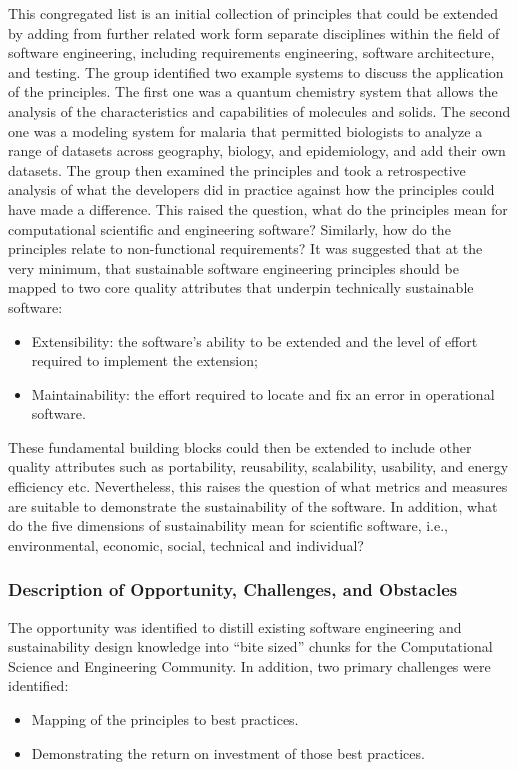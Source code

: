 This congregated list is an initial collection of principles that could be
extended by adding from further related work form separate disciplines within
the field of software engineering, including requirements engineering, software
architecture, and testing. The group identified two example systems to discuss
the application of the principles. The first one was a quantum chemistry system
that allows the analysis of the characteristics and capabilities of molecules
and solids. The second one was a modeling system for malaria that permitted
biologists to analyze a range of datasets across geography, biology, and
epidemiology, and add their own datasets. The group then examined the principles
and took a retrospective analysis of what the developers did in practice against
how the principles could have made a difference. This raised the question, what
do the principles mean for computational scientific and engineering software?
Similarly, how do the principles relate to non-functional requirements? It was
suggested that at the very minimum, that sustainable software engineering
principles should be mapped to two core quality attributes that underpin
technically sustainable software:
\begin{itemize}
\item Extensibility: the software's ability to be extended and the level of
effort required to implement the extension;

\item Maintainability: the effort required to locate and fix an error in
operational software.

\end{itemize}
These fundamental building blocks could then be extended to include other
quality attributes such as portability, reusability, scalability, usability, and
energy efficiency etc. Nevertheless, this raises the question of what metrics
and measures are suitable to demonstrate the sustainability of the software. In
addition, what do the five dimensions of sustainability mean for scientific
software, i.e., environmental, economic, social, technical and individual?


\subsubsection{Description of Opportunity, Challenges, and Obstacles}
The opportunity was identified to distill existing software engineering and
sustainability design knowledge into ``bite sized'' chunks for the Computational
Science and Engineering Community. In addition, two primary challenges were
identified:
\begin{itemize}
\item Mapping of the principles to best practices.
\item Demonstrating the return on investment of those best practices.
\end{itemize}

